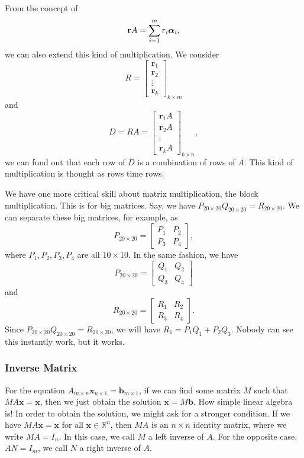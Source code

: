 \documentclass[11pt]{article}
\theoremstyle{break}
\theoremstyle{no_label}
\newcommand{\bbR}{\mathbb{R}}
\newcommand{\bfb}{\textbf{b}}
\newcommand{\bfr}{\textbf{r}}
\newcommand{\bfx}{\textbf{x}}
\newcommand{\bfalpha}{\text{\boldmath$\alpha$}}
\numberwithin{equation}{section}
\begin{document}
From the concept of $$\bfr A=\sum_{i=1}^{m}r_i\bfalpha_i,$$ we can also extend this kind of multiplication. We consider $$R=\begin{bmatrix}
    \bfr_1 \\ \bfr_2 \\ \vdots \\ \bfr_k
\end{bmatrix}_{k\times m}$$ and $$D=RA=\begin{bmatrix}
    \bfr_1A \\ \bfr_2A \\ \vdots \\ \bfr_kA
\end{bmatrix}_{k\times n},$$ we can fund out that each row of $D$ is a combination of rows of $A$. This kind of multiplication is thought as rows time rows.

We have one more critical skill about matrix multiplication, the block multiplication. This is for big matrices. Say, we have $P_{20\times 20}Q_{20\times 20}=R_{20\times 20}$. We can separate these big matrices, for example, as $$P_{20\times 20}=\begin{bmatrix}
    P_1 & P_2\\
    P_3 & P_4
\end{bmatrix},$$ where $P_1, P_2, P_3, P_4$ are all $10\times 10$. In the same fashion, we have $$P_{20\times 20}=\begin{bmatrix}
    Q_1 & Q_2\\
    Q_3 & Q_4
\end{bmatrix}$$ and $$R_{20\times 20}=\begin{bmatrix}
    R_1 & R_2\\
    R_3 & R_4
\end{bmatrix}.$$ Since $P_{20\times 20}Q_{20\times 20}=R_{20\times 20}$, we will have $R_1=P_1Q_1+P_2Q_3$. Nobody can see this instantly work, but it works.

\subsubsection*{Inverse Matrix}

For the equation $A_{m\times n}\bfx_{n\times 1}=\bfb_{m\times 1}$, if we can find some matrix $M$ such that $MA\bfx=\bfx$, then we just obtain the solution $\bfx=M\bfb$. How simple linear algebra is! In order to obtain the solution, we might ask for a stronger condition. If we have $MA\bfx=\bfx$ for all $\bfx\in\bbR^{n}$, then $MA$ is an $n\times n$ identity matrix, where we write $MA=I_n$. In this case, we call $M$ a left inverse of $A$. For the opposite case, $AN=I_m$, we call $N$ a right inverse of $A$.
\end{document}
